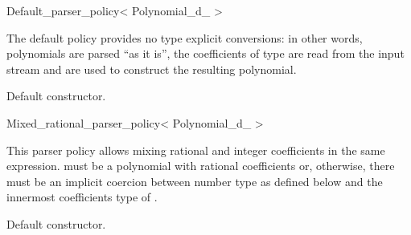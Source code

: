 \begin{ccRefClass} {Default_parser_policy< Polynomial_d_ >}

\ccDefinition
The default policy provides no type explicit conversions: in other words, polynomials are parsed ``as it is'', the coefficients of type  are read from the input stream and are used to construct the resulting polynomial.


\ccIsModel
{}

\ccTypes

\ccGlue


\ccCreation
{}

{Default constructor.}

\end{ccRefClass}

\begin{ccRefClass} {Mixed_rational_parser_policy< Polynomial_d_ >}

\ccDefinition
This parser policy allows mixing rational and integer coefficients in the same expression.  must be a polynomial with rational coefficients or, otherwise, there must be an implicit coercion between  number type as defined below and
the innermost coefficients type of . 


\ccIsModel
{}

\ccInheritsFrom
{}

\ccTypes

\ccGlue
{}\ccGlue
{}\ccGlue
{}\ccGlue


\ccCreation
{}

{Default constructor.}

\end{ccRefClass}

